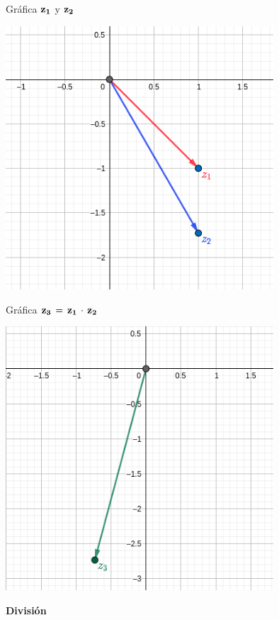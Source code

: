 \documentclass[a4paper,11pt,openany]{book}
\begin{document}
\textcolor{ao(english)}{} Gráfica $\bf{z_{1}}$ y $\bf{z_{2}}$

\begin{center}
    \includegraphics[width=10cm]{Gra-Ej-3-1.png}
\end{center}

\textcolor{ao(english)}{} Gráfica $\bf{z_{3}\,=\,z_{1}\,\cdot\,z_{2}}$

\begin{center}
    \includegraphics[width=10cm]{Gra-Ej-3-2.png}
\end{center}




\begin{center}
\textbf{División}
\end{center}
\end{document}
